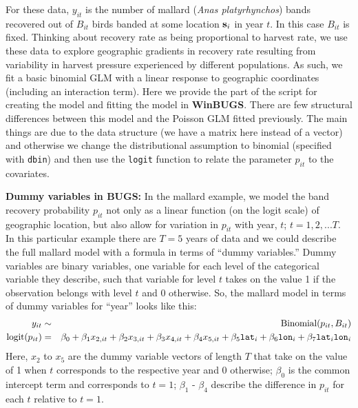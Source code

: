 For these data, $y_{it}$ is the number of mallard ({\it Anas platyrhynchos}) bands recovered out
of $B_{it}$ birds banded at some location ${\bf s}_{i}$ in year $t$. In this case $B_{it}$ is
fixed. Thinking about recovery rate as being proportional to harvest
rate, we use these data to explore geographic gradients in recovery rate
resulting from variability in harvest pressure experienced by different
populations. 
As such, we fit a
basic binomial GLM with a linear response to geographic coordinates
(including an interaction term). 
Here we
 provide the part of the script for creating the model and fitting the
 model in
{\bf WinBUGS}.
There are few structural differences between this model and the
Poisson GLM fitted previously. The main things are due to the data
structure (we have a matrix here instead of a vector) and otherwise we
change the  distributional assumption to binomial (specified with
\mbox{\tt dbin}) and then use the \mbox{\tt logit} function to relate
the parameter $p_{it}$ to the covariates.  

{\flushleft \bf Dummy variables in BUGS: }
In the mallard example, we model the band
recovery probability $p_{it}$ not only as a linear function (on the logit
scale) of geographic location, but also allow for variation in $p_{it}$
with year, $t$; $t=1,2,...T$. In this particular example there are
$T=5$ years of data and we could describe the full mallard
model with a formula in terms of ``dummy variables.'' Dummy variables
are binary
variables, one variable for each level of the categorical variable
they describe, such that variable for level $t$ takes on the value 1
if the observation belongs with level $t$ and 0 otherwise. So, the
mallard model in terms of dummy variables for ``year'' looks like this:
\begin{eqnarray*}
y_{it} &\sim & \mbox{Binomial}(p_{it}, B_{it}) \\
\mbox{logit}(p_{it}) &=& \beta_0 + \beta_1 x_{2,it}+ \beta_2 x_{3,it} +
\beta_3 x_{4,it} + \beta_4 x_{5,it} + 
\beta_5 \mbox{\tt lat}_i + \beta_6 \mbox{\tt lon}_i + \beta_7
\mbox{\tt lat}_i \mbox{\tt lon}_i
\end{eqnarray*}
Here, $x_{2}$ to $x_{5}$ are the dummy variable vectors of length $T$
that take on the value of 1 when $t$ corresponds to the respective
year and 0 otherwise; $\beta_0$ is the common intercept term and
corresponds to $t=1$; $\beta_1$ - $\beta_4$ describe the difference in
$p_{it}$ for each $t$ relative to $t=1$.

